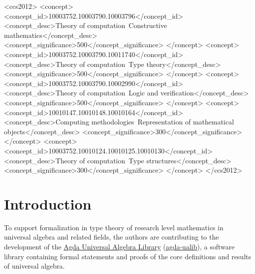 \documentclass[sigplan,screen]{acmart}
\begin{document}
\begin{CCSXML}
<ccs2012>
   <concept>
       <concept_id>10003752.10003790.10003796</concept_id>
       <concept_desc>Theory of computation~Constructive mathematics</concept_desc>
       <concept_significance>500</concept_significance>
       </concept>
   <concept>
       <concept_id>10003752.10003790.10011740</concept_id>
       <concept_desc>Theory of computation~Type theory</concept_desc>
       <concept_significance>500</concept_significance>
       </concept>
   <concept>
       <concept_id>10003752.10003790.10002990</concept_id>
       <concept_desc>Theory of computation~Logic and verification</concept_desc>
       <concept_significance>500</concept_significance>
       </concept>
   <concept>
       <concept_id>10010147.10010148.10010164</concept_id>
       <concept_desc>Computing methodologies~Representation of mathematical objects</concept_desc>
       <concept_significance>300</concept_significance>
       </concept>
   <concept>
       <concept_id>10003752.10010124.10010125.10010130</concept_id>
       <concept_desc>Theory of computation~Type structures</concept_desc>
       <concept_significance>300</concept_significance>
       </concept>
 </ccs2012>
\end{CCSXML}




\maketitle

\section{Introduction}\label{introduction}
To support formalization in type theory of research level mathematics in universal algebra and related fields, the authors are contributing to the development of the \href{https://ualib.org}{Agda Universal Algebra Library} (\href{https://ualib.org}{agda-ualib}), a software library containing formal statements and proofs of the core definitions and results of universal algebra.
\end{document}
